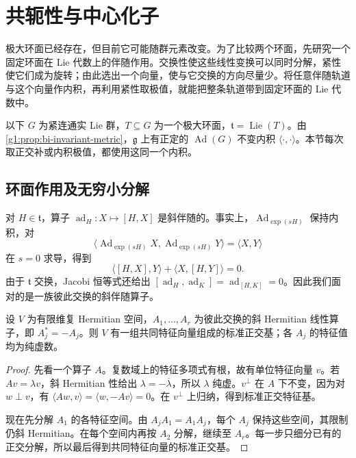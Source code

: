 
% 
% 

\section{共轭性与中心化子}
\label{g1:sec:1903}

极大环面已经存在，但目前它可能随群元素改变。为了比较两个环面，先研究一个固定环面在 Lie 代数上的伴随作用。交换性使这些线性变换可以同时分解，紧性使它们成为旋转；由此选出一个向量，使与它交换的方向尽量少。将任意伴随轨道与这个向量作内积，再利用紧性取极值，就能把整条轨道带到固定环面的 Lie 代数中。

\ProseParagraphBreak

以下 \(G\) 为紧连通实 Lie 群，\(T\subseteq G\) 为一个极大环面，\(\mathfrak t=\operatorname{Lie}(T)\)。由\cref{g1:prop:bi-invariant-metric}，\(\mathfrak g\) 上有正定的 \(\operatorname{Ad}(G)\) 不变内积 \(\langle\cdot,\cdot\rangle\)。本节每次取正交补或内积极值，都使用这同一个内积。

\subsection{环面作用及无穷小分解}
\label{g1:subsec:1903:01}
对 \(H\in\mathfrak t\)，算子 \(\operatorname{ad}_H:X\mapsto[H,X]\) 是斜伴随的。事实上，\(\operatorname{Ad}_{\exp(sH)}\) 保持内积，对
\[
	\langle\operatorname{Ad}_{\exp(sH)}X,
	\operatorname{Ad}_{\exp(sH)}Y\rangle=\langle X,Y\rangle
\]
在 \(s=0\) 求导，得到
\begin{equation}\label{g1:eq:invariant-inner-product-bracket}
	\langle[H,X],Y\rangle+\langle X,[H,Y]\rangle=0.
\end{equation}
由于 \(\mathfrak t\) 交换，Jacobi 恒等式还给出 \([\operatorname{ad}_H,\operatorname{ad}_K]=\operatorname{ad}_{[H,K]}=0\)。因此我们面对的是一族彼此交换的斜伴随算子。

\begin{lemma}\label{g1:lem:commuting-skew-hermitian}
	设 \(V\) 为有限维复 Hermitian 空间，\(A_1,\ldots,A_r\) 为彼此交换的斜 Hermitian 线性算子，即 \(A_j^*=-A_j\)。则 \(V\) 有一组共同特征向量组成的标准正交基；各 \(A_j\) 的特征值均为纯虚数。
\end{lemma}
\begin{proof}
	先看一个算子 \(A\)。复数域上的特征多项式有根，故有单位特征向量 \(v\)。若 \(Av=\lambda v\)，斜 Hermitian 性给出 \(\lambda=-\overline\lambda\)，所以 \(\lambda\) 纯虚。\(v^\perp\) 在 \(A\) 下不变，因为对 \(w\perp v\)，有 \(\langle Aw,v\rangle=\langle w,-Av\rangle=0\)。在 \(v^\perp\) 上归纳，得到标准正交特征基。

	现在先分解 \(A_1\) 的各特征空间。由 \(A_jA_1=A_1A_j\)，每个 \(A_j\) 保持这些空间，其限制仍斜 Hermitian。在每个空间内再按 \(A_2\) 分解，继续至 \(A_r\)。每一步只细分已有的正交分解，所以最后得到共同特征向量的标准正交基。
\end{proof}

